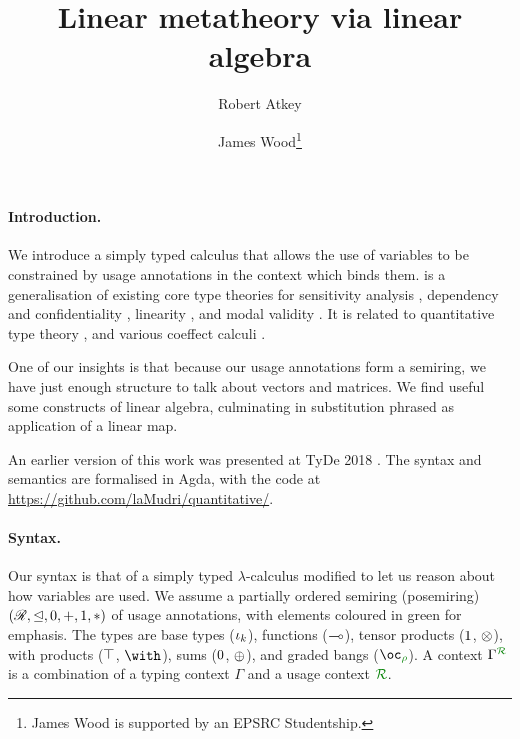 \documentclass[a4paper]{easychair}
\begin{document}
\title{Linear metatheory via linear algebra}

\author{
  Robert Atkey
  \and
  James Wood\thanks{James Wood is supported by an EPSRC Studentship.}
}



\maketitle

\paragraph{Introduction.}

We introduce a simply typed calculus \name{} that allows the use of variables to
be constrained by usage annotations in the context which binds them.
\name{} is a generalisation of existing core type theories for sensitivity analysis
\cite{reed10distance}, dependency and confidentiality \cite{abadi99core},
linearity \cite{Barber1996}, and modal validity \cite{judgmental}.
It is related to quantitative type theory \cite{quantitative-type-theory}, and
various coeffect calculi \cite{PetricekOM14,BrunelGMZ14,GhicaS14}.

One of our insights is that because our usage annotations form a semiring, we
have just enough structure to talk about vectors and matrices.
We find useful some constructs of linear algebra, culminating in substitution
phrased as application of a linear map.

An earlier version of this work was presented at TyDe 2018
\cite{context-constrained}.
The syntax and semantics are formalised in Agda, with the code at
\url{https://github.com/laMudri/quantitative/}.

\paragraph{Syntax.}

Our syntax is that of a simply typed $\lambda$-calculus modified to let us
reason about how variables are used.
We assume a partially ordered semiring (posemiring) $(\mathscr R, \trianglelefteq, 0,
+, 1, *)$ of usage annotations, with elements coloured in green for emphasis.
The types are base types ($\iota_k$), functions ($\multimap$), tensor products
($1$, $\otimes$), with products ($\top$, $\withT{}{}$), sums
($0$, $\oplus$), and graded bangs ($\excl{\rho}{}$).
A context $\ctx{\Gamma}{R}$ is a combination of a typing context $\Gamma$ and a
usage context $\resctx R$.
\end{document}
